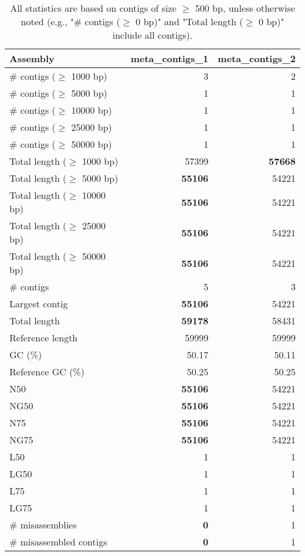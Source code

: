 \documentclass[12pt,a4paper]{article}
\begin{document}
\begin{table}[ht]
\begin{center}
\caption{All statistics are based on contigs of size $\geq$ 500 bp, unless otherwise noted (e.g., "\# contigs ($\geq$ 0 bp)" and "Total length ($\geq$ 0 bp)" include all contigs).}
\begin{tabular}{|l*{2}{|r}|}
\hline
Assembly & meta\_contigs\_1 & meta\_contigs\_2 \\ \hline
\# contigs ($\geq$ 1000 bp) & 3 & 2 \\ \hline
\# contigs ($\geq$ 5000 bp) & 1 & 1 \\ \hline
\# contigs ($\geq$ 10000 bp) & 1 & 1 \\ \hline
\# contigs ($\geq$ 25000 bp) & 1 & 1 \\ \hline
\# contigs ($\geq$ 50000 bp) & 1 & 1 \\ \hline
Total length ($\geq$ 1000 bp) & 57399 & {\bf 57668} \\ \hline
Total length ($\geq$ 5000 bp) & {\bf 55106} & 54221 \\ \hline
Total length ($\geq$ 10000 bp) & {\bf 55106} & 54221 \\ \hline
Total length ($\geq$ 25000 bp) & {\bf 55106} & 54221 \\ \hline
Total length ($\geq$ 50000 bp) & {\bf 55106} & 54221 \\ \hline
\# contigs & 5 & 3 \\ \hline
Largest contig & {\bf 55106} & 54221 \\ \hline
Total length & {\bf 59178} & 58431 \\ \hline
Reference length & 59999 & 59999 \\ \hline
GC (\%) & 50.17 & 50.11 \\ \hline
Reference GC (\%) & 50.25 & 50.25 \\ \hline
N50 & {\bf 55106} & 54221 \\ \hline
NG50 & {\bf 55106} & 54221 \\ \hline
N75 & {\bf 55106} & 54221 \\ \hline
NG75 & {\bf 55106} & 54221 \\ \hline
L50 & 1 & 1 \\ \hline
LG50 & 1 & 1 \\ \hline
L75 & 1 & 1 \\ \hline
LG75 & 1 & 1 \\ \hline
\# misassemblies & {\bf 0} & 1 \\ \hline
\# misassembled contigs & {\bf 0} & 1 \\ \hline

\end{tabular}
\end{center}
\end{table}
\end{document}

